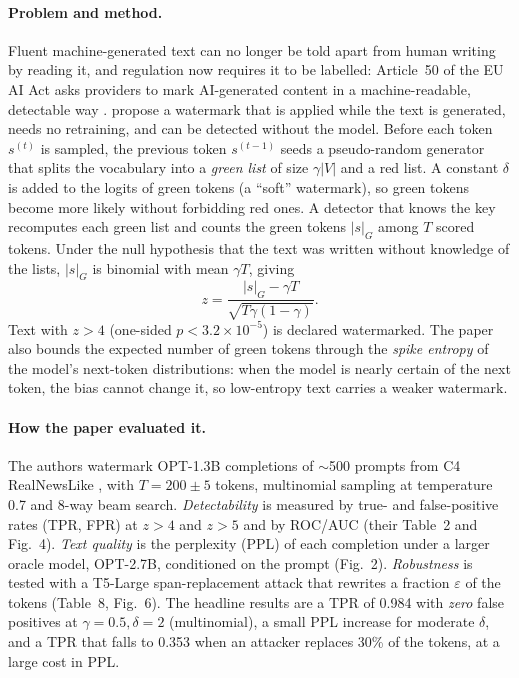 \documentclass[11pt]{article}
\begin{document}
\paragraph{Problem and method.}
Fluent machine-generated text can no longer be told apart from human writing by reading it, and regulation now requires it to be labelled: Article~50 of the EU AI Act asks providers to mark AI-generated content in a machine-readable, detectable way \citep{euaiact2024}. \citet{kirchenbauer2023watermark} propose a watermark that is applied while the text is generated, needs no retraining, and can be detected without the model. Before each token $s^{(t)}$ is sampled, the previous token $s^{(t-1)}$ seeds a pseudo-random generator that splits the vocabulary into a \emph{green list} of size $\gamma|V|$ and a red list. A constant $\delta$ is added to the logits of green tokens (a ``soft'' watermark), so green tokens become more likely without forbidding red ones. A detector that knows the key recomputes each green list and counts the green tokens $|s|_G$ among $T$ scored tokens. Under the null hypothesis that the text was written without knowledge of the lists, $|s|_G$ is binomial with mean $\gamma T$, giving
\begin{equation}
z=\frac{|s|_G-\gamma T}{\sqrt{T\gamma(1-\gamma)}} .
\label{eq:z}
\end{equation}
Text with $z>4$ (one-sided $p<3.2\times10^{-5}$) is declared watermarked. The paper also bounds the expected number of green tokens through the \emph{spike entropy} of the model's next-token distributions: when the model is nearly certain of the next token, the bias cannot change it, so low-entropy text carries a weaker watermark.

\paragraph{How the paper evaluated it.}
The authors watermark OPT-1.3B \citep{zhang2022opt} completions of $\sim$500 prompts from C4 RealNewsLike \citep{raffel2020t5}, with $T=200\pm5$ tokens, multinomial sampling at temperature 0.7 and 8-way beam search. \emph{Detectability} is measured by true- and false-positive rates (TPR, FPR) at $z>4$ and $z>5$ and by ROC/AUC (their Table~2 and Fig.~4). \emph{Text quality} is the perplexity (PPL) of each completion under a larger oracle model, OPT-2.7B, conditioned on the prompt (Fig.~2). \emph{Robustness} is tested with a T5-Large span-replacement attack that rewrites a fraction $\varepsilon$ of the tokens (Table~8, Fig.~6). The headline results are a TPR of 0.984 with \emph{zero} false positives at $\gamma{=}0.5,\delta{=}2$ (multinomial), a small PPL increase for moderate $\delta$, and a TPR that falls to 0.353 when an attacker replaces 30\% of the tokens, at a large cost in PPL.
\end{document}
